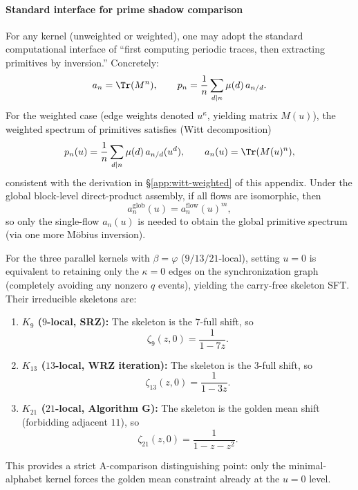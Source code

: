 \paragraph{Standard interface for prime shadow comparison}
For any kernel (unweighted or weighted), one may adopt the standard computational interface of ``first computing periodic traces, then extracting primitives by inversion.'' Concretely:
\[
a_n=\Tr(M^n),\qquad
p_n=\frac{1}{n}\sum_{d\mid n}\mu(d)\,a_{n/d}.
\]
For the weighted case (edge weights denoted $u^{\kappa}$, yielding matrix $M(u)$), the weighted spectrum of primitives satisfies (Witt decomposition)
\[
p_n(u)=\frac{1}{n}\sum_{d\mid n}\mu(d)\,a_{n/d}(u^d),
\qquad a_n(u)=\Tr(M(u)^n),
\]
consistent with the derivation in \S\ref{app:witt-weighted} of this appendix.
Under the global block-level direct-product assembly, if all flows are isomorphic, then
\[
a_n^{\mathrm{glob}}(u)=a_n^{\mathrm{flow}}(u)^m,
\]
so only the single-flow $a_n(u)$ is needed to obtain the global primitive spectrum (via one more M\"obius inversion).

\begin{proposition}\label{prop:carry-free-skeleton-three}
For the three parallel kernels with $\beta=\varphi$ ($9/13/21$-local), setting $u=0$ is equivalent to retaining only the $\kappa=0$ edges on the synchronization graph (completely avoiding any nonzero $q$ events), yielding the carry-free skeleton SFT. Their irreducible skeletons are:
\begin{enumerate}
  \item \textbf{$K_9$ ($9$-local, SRZ):} The skeleton is the $7$-full shift, so
  \[
  \zeta_{9}(z,0)=\frac{1}{1-7z}.
  \]
  \item \textbf{$K_{13}$ ($13$-local, WRZ iteration):} The skeleton is the $3$-full shift, so
  \[
  \zeta_{13}(z,0)=\frac{1}{1-3z}.
  \]
  \item \textbf{$K_{21}$ ($21$-local, Algorithm G):} The skeleton is the golden mean shift (forbidding adjacent $11$), so
  \[
  \zeta_{21}(z,0)=\frac{1}{1-z-z^2}.
  \]
\end{enumerate}
This provides a strict A-comparison distinguishing point: only the minimal-alphabet kernel forces the golden mean constraint already at the $u=0$ level.
\end{proposition}

